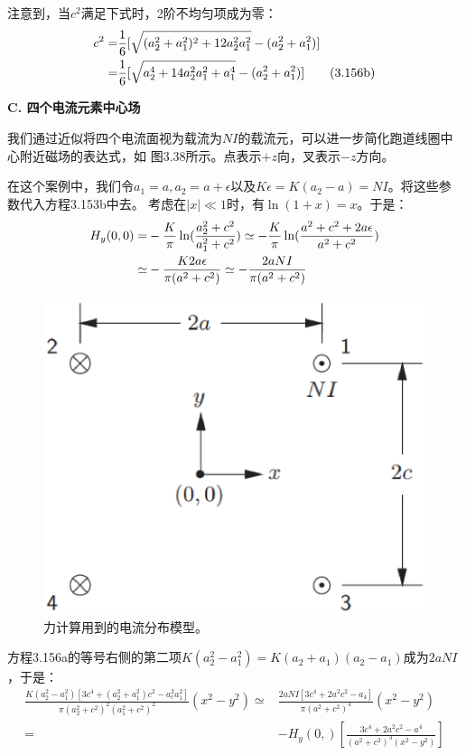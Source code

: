 注意到，当$c^2$满足下式时，2阶不均匀项成为零：
\begin{align*}
c^{2}=&\frac{1}{6}[\sqrt{(a_{2}^{2}+a_{1}^{2})^{2}+12a_{2}^{2}a_{1}^{2}}-(a_{2}^{2}+a_{1}^{2})]\\\notag
=&\frac{1}{6}[\sqrt{a_{2}^{4}+14a_{2}^{2}a_{1}^{2}+a_{1}^{4}}-(a_{2}^{2}+a_{1}^{2})]
\tag{3.156b}
\end{align*}

\textbf{C. 四个电流元素中心场}

我们通过近似将四个电流面视为载流为$NI$的载流元，可以进一步简化跑道线圈中心附近磁场的表达式，如
图3.38所示。点表示$+z$向，叉表示$-z$方向。

在这个案例中，我们令$a_1=a,a_2=a+\epsilon$以及$K\epsilon=K(a_2-a)=NI$。将这些参数代入方程3.153b中去。
考虑在$|x|\ll 1$时，有$\ln(1+x)=x$。于是：
\begin{align}
H_{y}(0,0)=&-\frac{K}{\pi}\ln(\frac{a_{2}^{2}+c^{2}}{a_{1}^{2}+c^{2}})\simeq-\frac{K}{\pi}\ln(\frac{a^{2}+c^{2}+2a\epsilon}{a^{2}+c^{2}})\\
\simeq&-\frac{K2a\epsilon}{\pi(a^{2}+c^{2})}\simeq-\frac{2aNI}{\pi(a^{2}+c^{2})}\notag
\end{align}

\begin{figure}[htbp]
	\centering
	\includegraphics[scale=0.5]{chpt3/figs/fig3.38.eps}
	\caption{力计算用到的电流分布模型。}
\end{figure}

方程3.156a的等号右侧的第二项$K(a_2^2−a^2_1)=K(a_2+a_1)(a_2−a_1)$成为$2aNI$，于是：
\begin{align*}
\frac{K(a_{2}^{2}-a_{1}^{2})[3c^{4}+(a_{2}^{2}+a_{1}^{2})c^{2}-a_{c}^{2}a_{1}^{2}]}{\pi(a_{2}^{2}+c^{2})^{2}(a_{1}^{2}+c^{2})^{2}}(x^{2}-y^{2})\simeq&\frac{2aNI[3c^{4}+2a^{2}c^{2}-a_{4}]}{\pi(a^{2}+c^{2})^{4}}(x^{2}-y^{2})\\
=&-H_{y}(0,)\left[\frac{3c^{4}+2a^{2}c^{2}-a^{4}}{(a^{2}+c^{2})^{3}(x^{2}-y^{2})}\right]
\end{align*}

